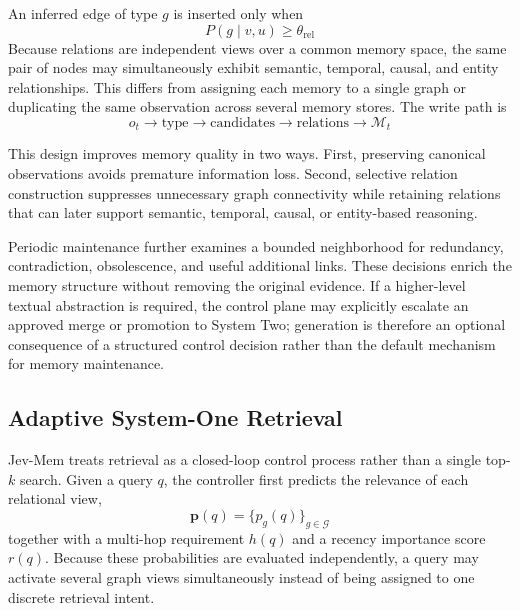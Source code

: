 \documentclass[11pt]{article}
\begin{document}
An inferred edge of type $g$ is inserted only when
\begin{equation}
P(g\mid v,u)\geq\theta_{\mathrm{rel}}
\end{equation}
Because relations are independent views over a common memory space, the same pair of nodes may simultaneously exhibit semantic, temporal, causal, and entity relationships. This differs from assigning each memory to a single graph or duplicating the same observation across several memory stores. The write path is
\begin{equation}
o_t
\rightarrow \mathrm{type}
\rightarrow \mathrm{candidates}
\rightarrow \mathrm{relations}
\rightarrow \mathcal{M}_t
\end{equation}

This design improves memory quality in two ways. First, preserving canonical observations avoids premature information loss. Second, selective relation construction suppresses unnecessary graph connectivity while retaining relations that can later support semantic, temporal, causal, or entity-based reasoning.

Periodic maintenance further examines a bounded neighborhood for redundancy, contradiction, obsolescence, and useful additional links. These decisions enrich the memory structure without removing the original evidence. If a higher-level textual abstraction is required, the control plane may explicitly escalate an approved merge or promotion to System Two; generation is therefore an optional consequence of a structured control decision rather than the default mechanism for memory maintenance.

\subsection{Adaptive System-One Retrieval}
\label{sec:adaptive-retrieval}

Jev-Mem treats retrieval as a closed-loop control process rather than a single top-$k$ search. Given a query $q$, the controller first predicts the relevance of each relational view,
\begin{equation}
\mathbf{p}(q)
=
\{p_g(q)\}_{g\in\mathcal{G}}
\end{equation}
together with a multi-hop requirement $h(q)$ and a recency importance score $r(q)$. Because these probabilities are evaluated independently, a query may activate several graph views simultaneously instead of being assigned to one discrete retrieval intent.
\end{document}
